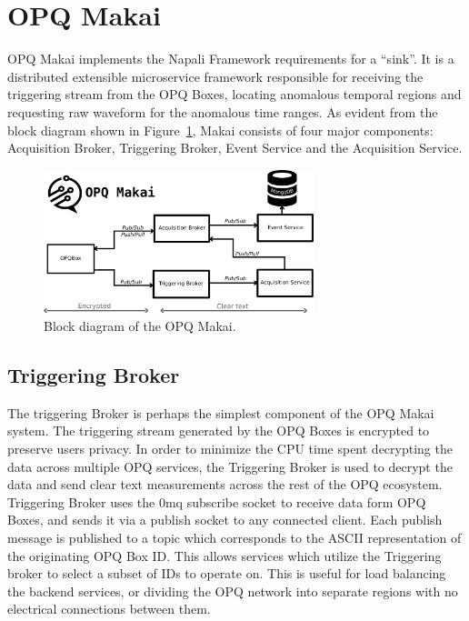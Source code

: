 \section{OPQ Makai}\label{sec:opq-makai}

OPQ Makai implements the Napali Framework requirements for a ``sink''.
 It is a distributed extensible microservice framework responsible for receiving the triggering stream from the OPQ Boxes, locating anomalous temporal regions and requesting raw waveform for the anomalous time ranges.
 As evident from the block diagram shown in Figure~\ref{fig:opq:10}, Makai consists of four major components: Acquisition Broker, Triggering Broker, Event Service and the Acquisition Service.
\begin{figure}[h]
  \begin{center}
  \includegraphics[width=0.7\textwidth]{img/makai_main.pdf}
  \end{center}
  \caption{Block diagram of the OPQ Makai.}
  \label{fig:opq:10}
\end{figure}

\subsection{Triggering Broker}\label{subsec:triggering-broker}

The triggering Broker is perhaps the simplest component of the OPQ Makai system.
The triggering stream generated by the OPQ Boxes is encrypted to preserve users privacy.
In order to minimize the CPU time spent decrypting the data across multiple OPQ services, the Triggering Broker is used to decrypt the data and send clear text measurements across the rest of the OPQ ecosystem.
Triggering Broker uses the 0mq subscribe socket to receive data form OPQ Boxes, and sends it via a publish socket to any connected client.
Each publish message is published to a topic which corresponds to the ASCII representation of the originating OPQ Box ID.
This allows services which utilize the Triggering broker to select a subset of IDs to operate on.
This is useful for load balancing the backend services, or dividing the OPQ network into separate regions with no electrical connections between them.

